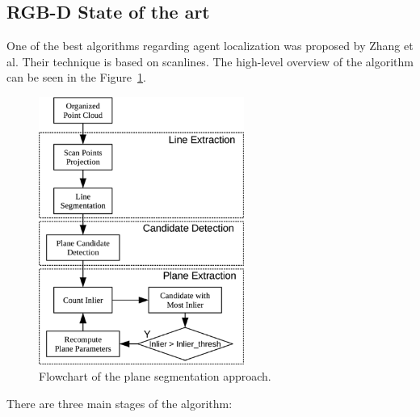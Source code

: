 \subsection{RGB-D State of the art}

One of the best algorithms regarding agent localization was proposed by Zhang \cite{articleFPSLinePrimitivesRGBD} et al.
Their technique is based on scanlines.
The high-level overview of the algorithm can be seen in the Figure~\ref{figure:Flowchart-Zhang}.

\begin{figure}[H]
    \centering
    \includegraphics[width=0.6\textwidth]{images/psd/RGBD/Flowchart-Zhang.png}
    \caption{Flowchart of the plane segmentation approach. \cite{articleFPSLinePrimitivesRGBD}}
    \label{figure:Flowchart-Zhang}
\end{figure}

There are three main stages of the algorithm:

